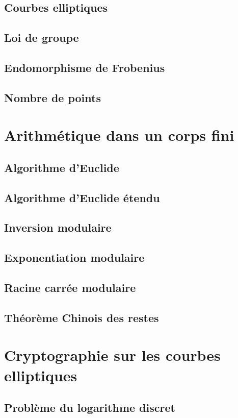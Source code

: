 \documentclass[letterpaper, 12pt]{article}
\begin{document}
    \subsection{Courbes elliptiques}
    
    \subsection{Loi de groupe}
    
    \subsection{Endomorphisme de Frobenius}
    
    \subsection{Nombre de points}
\section{Arithmétique dans un corps fini}
    \subsection{Algorithme d'Euclide}
    \subsection{Algorithme d'Euclide étendu}
    \subsection{Inversion modulaire}
    \subsection{Exponentiation modulaire}
    \subsection{Racine carrée modulaire}
    \subsection{Théorème Chinois des restes}

\section{Cryptographie sur les courbes elliptiques}
    \subsection{Problème du logarithme discret}
    
\end{document}

